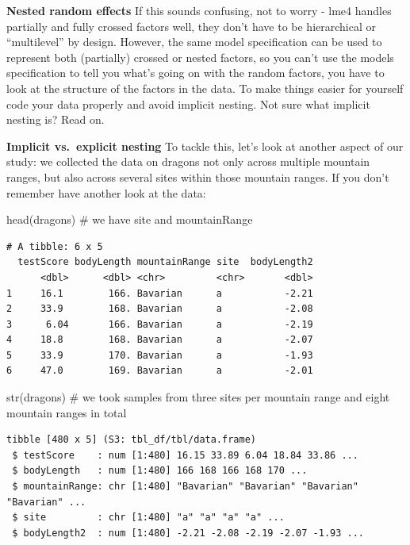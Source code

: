 \documentclass[
  letterpaper,
  DIV=11,
  numbers=noendperiod]{scrreprt}
\newenvironment{Shaded}{\begin{snugshade}}{\end{snugshade}}
\newcommand{\CommentTok}[1]{\textcolor[rgb]{0.37,0.37,0.37}{#1}}
\newcommand{\FunctionTok}[1]{\textcolor[rgb]{0.28,0.35,0.67}{#1}}
\newcommand{\NormalTok}[1]{\textcolor[rgb]{0.00,0.23,0.31}{#1}}
\begin{document}
\textbf{Nested random effects} If this sounds confusing, not to worry -
lme4 handles partially and fully crossed factors well, they don't have
to be hierarchical or ``multilevel'' by design. However, the same model
specification can be used to represent both (partially) crossed or
nested factors, so you can't use the models specification to tell you
what's going on with the random factors, you have to look at the
structure of the factors in the data. To make things easier for yourself
code your data properly and avoid implicit nesting. Not sure what
implicit nesting is? Read on.

\textbf{Implicit vs.~explicit nesting} To tackle this, let's look at
another aspect of our study: we collected the data on dragons not only
across multiple mountain ranges, but also across several sites within
those mountain ranges. If you don't remember have another look at the
data:

\begin{Shaded}
\begin{Highlighting}[]
\FunctionTok{head}\NormalTok{(dragons)  }\CommentTok{\# we have site and mountainRange}
\end{Highlighting}
\end{Shaded}

\begin{verbatim}
# A tibble: 6 x 5
  testScore bodyLength mountainRange site  bodyLength2
      <dbl>      <dbl> <chr>         <chr>       <dbl>
1     16.1        166. Bavarian      a           -2.21
2     33.9        168. Bavarian      a           -2.08
3      6.04       166. Bavarian      a           -2.19
4     18.8        168. Bavarian      a           -2.07
5     33.9        170. Bavarian      a           -1.93
6     47.0        169. Bavarian      a           -2.01
\end{verbatim}

\begin{Shaded}
\begin{Highlighting}[]
\FunctionTok{str}\NormalTok{(dragons)  }\CommentTok{\# we took samples from three sites per mountain range and eight mountain ranges in total}
\end{Highlighting}
\end{Shaded}

\begin{verbatim}
tibble [480 x 5] (S3: tbl_df/tbl/data.frame)
 $ testScore    : num [1:480] 16.15 33.89 6.04 18.84 33.86 ...
 $ bodyLength   : num [1:480] 166 168 166 168 170 ...
 $ mountainRange: chr [1:480] "Bavarian" "Bavarian" "Bavarian" "Bavarian" ...
 $ site         : chr [1:480] "a" "a" "a" "a" ...
 $ bodyLength2  : num [1:480] -2.21 -2.08 -2.19 -2.07 -1.93 ...
\end{verbatim}
\end{document}
